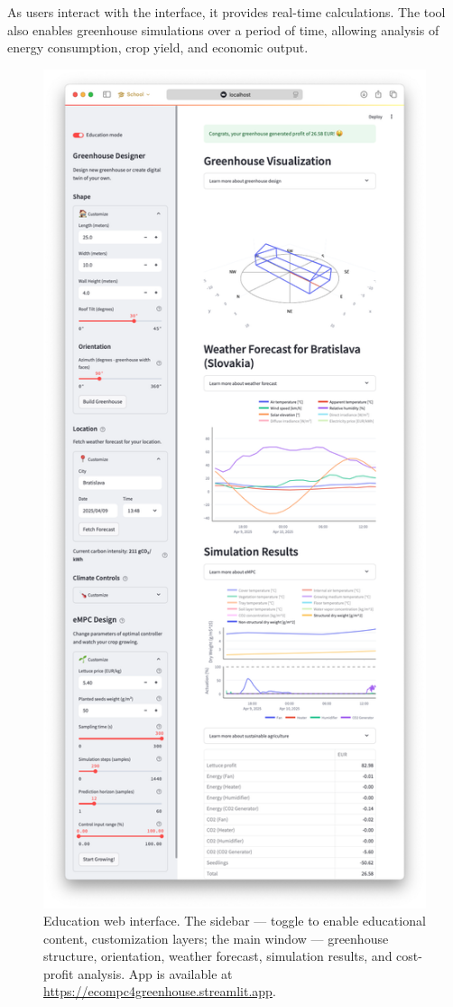 \documentclass[conference]{IEEEtran}
\begin{document}
As users interact with the interface, it provides real-time calculations. The tool also enables greenhouse simulations over a period of time, allowing analysis of energy consumption, crop yield, and economic output.
\begin{figure}\label{fig:web}
    \centering
    \includegraphics[width=\linewidth, trim=50 50 50 50]{figures/webpage.png}
    \caption{Education web interface. The sidebar ---  toggle to enable educational content, customization layers; the main window --- greenhouse structure, orientation, weather forecast, simulation results, and cost-profit analysis. App is available at \url{https://ecompc4greenhouse.streamlit.app}.}
\end{figure}
\end{document}
